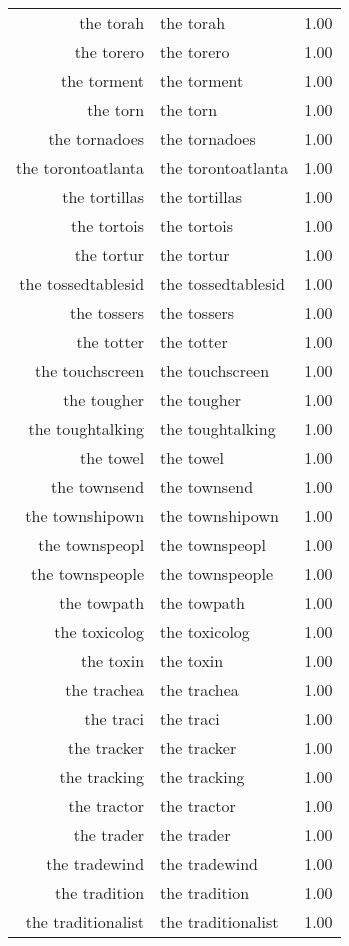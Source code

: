 \begin{table}[ht]
\begin{tabular}{rlr}
  the torah & the torah & 1.00 \\ 
  the torero & the torero & 1.00 \\ 
  the torment & the torment & 1.00 \\ 
  the torn & the torn & 1.00 \\ 
  the tornadoes & the tornadoes & 1.00 \\ 
  the torontoatlanta & the torontoatlanta & 1.00 \\ 
  the tortillas & the tortillas & 1.00 \\ 
  the tortois & the tortois & 1.00 \\ 
  the tortur & the tortur & 1.00 \\ 
  the tossedtablesid & the tossedtablesid & 1.00 \\ 
  the tossers & the tossers & 1.00 \\ 
  the totter & the totter & 1.00 \\ 
  the touchscreen & the touchscreen & 1.00 \\ 
  the tougher & the tougher & 1.00 \\ 
  the toughtalking & the toughtalking & 1.00 \\ 
  the towel & the towel & 1.00 \\ 
  the townsend & the townsend & 1.00 \\ 
  the townshipown & the townshipown & 1.00 \\ 
  the townspeopl & the townspeopl & 1.00 \\ 
  the townspeople & the townspeople & 1.00 \\ 
  the towpath & the towpath & 1.00 \\ 
  the toxicolog & the toxicolog & 1.00 \\ 
  the toxin & the toxin & 1.00 \\ 
  the trachea & the trachea & 1.00 \\ 
  the traci & the traci & 1.00 \\ 
  the tracker & the tracker & 1.00 \\ 
  the tracking & the tracking & 1.00 \\ 
  the tractor & the tractor & 1.00 \\ 
  the trader & the trader & 1.00 \\ 
  the tradewind & the tradewind & 1.00 \\ 
  the tradition & the tradition & 1.00 \\ 
  the traditionalist & the traditionalist & 1.00 \\ 

\end{tabular}
\end{table}
